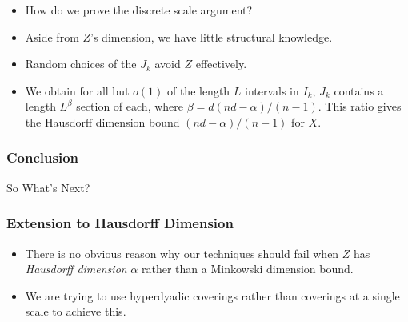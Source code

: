 \documentclass[usenames,dvipsnames]{beamer}
\begin{document}
\begin{frame}
\begin{center}
\begin{tikzpicture}[scale=0.7]
\end{tikzpicture}
\end{center}

    \begin{itemize}
        \item How do we prove the discrete scale argument?

        \item Aside from $Z$'s dimension, we have little structural knowledge.

        \item Random choices of the $J_k$ avoid $Z$ effectively.

        \item We obtain for all but $o(1)$ of the length $L$ intervals in $I_k$, $J_k$ contains a length $L^\beta$ section of each, where $\beta = d(nd - \alpha)/(n - 1)$. This ratio gives the Hausdorff dimension bound $(nd-\alpha)/(n-1)$ for $X$.
    \end{itemize}
\end{frame}

\begin{frame}
    \frametitle{Conclusion}

    {\Huge So What's Next?}
\end{frame}

\begin{frame}
    \frametitle{Extension to Hausdorff Dimension}

    \begin{itemize}
        \item There is no obvious reason why our techniques should fail when $Z$ has {\it Hausdorff dimension} $\alpha$ rather than a Minkowski dimension bound.

        \item We are trying to use hyperdyadic coverings rather than coverings at a single scale to achieve this.
    \end{itemize}
\end{frame}
\end{document}
